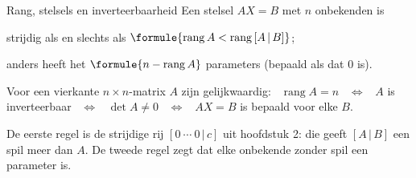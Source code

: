 \begin{theorie}
\begin{stelling}{Rang, stelsels en inverteerbaarheid}
Een stelsel $AX = B$ met $n$ onbekenden is

\vspace{1mm}
\quad strijdig als en slechts als $\formule{\operatorname{rang} A < \operatorname{rang}\,[A \,|\, B]}$;

\quad anders heeft het $\formule{n - \operatorname{rang} A}$ parameters (bepaald als dat 0 is).

\vspace{1mm}
Voor een vierkante $n \times n$-matrix $A$ zijn gelijkwaardig: \ $\operatorname{rang} A = n$ \ $\iff$ \ $A$ is inverteerbaar \ $\iff$ \ $\det A \neq 0$ \ $\iff$ \ $AX = B$ is bepaald voor elke $B$.
\end{stelling}
\end{theorie}

De eerste regel is de strijdige rij $[0 \ \cdots \ 0 \,|\, c]$ uit hoofdstuk 2: die geeft $[A \,|\, B]$ een spil meer dan $A$. De tweede regel zegt dat elke onbekende zonder spil een parameter is.


\begin{oefeningen}

\end{oefeningen}

\opdrachtenkop


